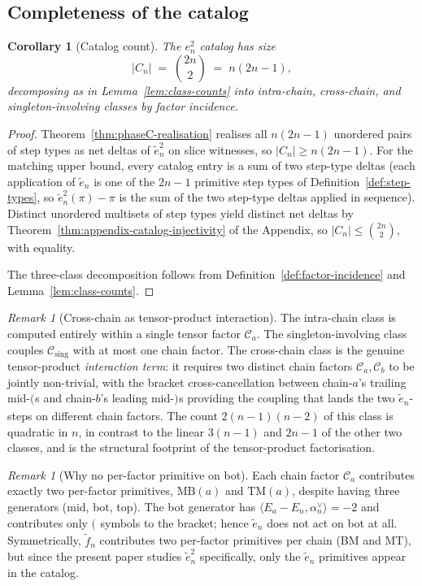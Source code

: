\documentclass[11pt]{article}
\newtheorem{corollary}[theorem]{Corollary}
\theoremstyle{definition}
\theoremstyle{remark}
\newtheorem{remark}[theorem]{Remark}
\newcommand{\MB}{\mathrm{MB}}
\newcommand{\TM}{\mathrm{TM}}
\newcommand{\Cmid}{\mathcal{C}}
\newcommand{\Csing}{\mathcal{C}_{\mathrm{sing}}}
\newcommand{\labr}[1]{{)}_{#1}}
\newcommand{\labl}[1]{{(}_{#1}}
\begin{document}
\subsection{Completeness of the catalog}\label{ssec:phaseC-completeness}

\begin{corollary}[Catalog count]\label{cor:phaseC-count}
The $e_n^2$ catalog has size
\[
|C_n| \;=\; \binom{2n}{2} \;=\; n(2n - 1),
\]
decomposing as in Lemma~\ref{lem:class-counts} into intra-chain,
cross-chain, and singleton-involving classes by factor incidence.
\end{corollary}

\begin{proof}
Theorem~\ref{thm:phaseC-realisation} realises all $n(2n - 1)$ unordered pairs of
step types as net deltas of $\tilde e_n^2$ on slice witnesses, so $|C_n| \geq
n(2n - 1)$. For the matching upper bound, every catalog entry is a sum of two
step-type deltas (each application of $\tilde e_n$ is one of the $2n - 1$ primitive
step types of Definition~\ref{def:step-types}, so $\tilde e_n^2(\pi) - \pi$ is
the sum of the two step-type deltas applied in sequence). Distinct unordered
multisets of step types yield distinct net deltas by
Theorem~\ref{thm:appendix-catalog-injectivity} of the Appendix, so
$|C_n| \leq \binom{2n}{2}$, with equality.

The three-class decomposition follows from
Definition~\ref{def:factor-incidence} and Lemma~\ref{lem:class-counts}.
\end{proof}

\begin{remark}[Cross-chain as tensor-product interaction]\label{rmk:cross-chain-interaction}
The intra-chain class is computed entirely within a single tensor factor
$\Cmid_a$. The singleton-involving class couples $\Csing$ with at most one chain
factor. The cross-chain class is the genuine tensor-product \emph{interaction
term}: it requires two distinct chain factors $\Cmid_a, \Cmid_b$ to be jointly
non-trivial, with the bracket cross-cancellation between chain-$a$'s trailing
mid-$\labl{}$s and chain-$b$'s leading mid-$\labr{}$s providing the coupling
that lands the two $\tilde e_n$-steps on different chain factors. The count
$2(n-1)(n-2)$ of this class is quadratic in $n$, in contrast to the linear
$3(n-1)$ and $2n - 1$ of the other two classes, and is the structural footprint
of the tensor-product factorisation.
\end{remark}

\begin{remark}[Why no per-factor primitive on bot]\label{rmk:no-bot-primitive}
Each chain factor $\Cmid_a$ contributes exactly two per-factor primitives, $\MB(a)$
and $\TM(a)$, despite having three generators (mid, bot, top). The bot generator
has $\langle E_a - E_n, \alpha_n^\vee\rangle = -2$ and contributes only $\labl{}$
symbols to the bracket; hence $\tilde e_n$ does not act on bot at all. Symmetrically,
$\tilde f_n$ contributes two per-factor primitives per chain (BM and MT), but
since the present paper studies $\tilde e_n^2$ specifically, only the
$\tilde e_n$ primitives appear in the catalog.
\end{remark}
\end{document}
